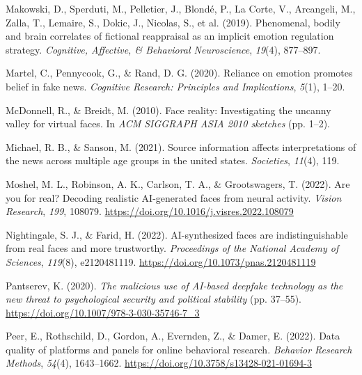 \documentclass[
  man,floatsintext]{apa6}
\newlength{\cslhangindent}
\newlength{\cslentryspacingunit} %
\newenvironment{CSLReferences}[2] %
 {%
  \setlength{\parindent}{0pt}
  \ifodd #1
  \let\oldpar\par
  \def\par{\hangindent=\cslhangindent\oldpar}
  \fi
  \setlength{\parskip}{#2\cslentryspacingunit}
 }%
 {}
\begin{document}
\begin{CSLReferences}{1}{0}
\leavevmode{}%
Makowski, D., Sperduti, M., Pelletier, J., Blondé, P., La Corte, V., Arcangeli, M., Zalla, T., Lemaire, S., Dokic, J., Nicolas, S., et al. (2019). Phenomenal, bodily and brain correlates of fictional reappraisal as an implicit emotion regulation strategy. \emph{Cognitive, Affective, \& Behavioral Neuroscience}, \emph{19}(4), 877--897.

\leavevmode{}%
Martel, C., Pennycook, G., \& Rand, D. G. (2020). Reliance on emotion promotes belief in fake news. \emph{Cognitive Research: Principles and Implications}, \emph{5}(1), 1--20.

\leavevmode{}%
McDonnell, R., \& Breidt, M. (2010). Face reality: Investigating the uncanny valley for virtual faces. In \emph{ACM SIGGRAPH ASIA 2010 sketches} (pp. 1--2).

\leavevmode{}%
Michael, R. B., \& Sanson, M. (2021). Source information affects interpretations of the news across multiple age groups in the united states. \emph{Societies}, \emph{11}(4), 119.

\leavevmode{}%
Moshel, M. L., Robinson, A. K., Carlson, T. A., \& Grootswagers, T. (2022). Are you for real? Decoding realistic AI-generated faces from neural activity. \emph{Vision Research}, \emph{199}, 108079. \url{https://doi.org/10.1016/j.visres.2022.108079}

\leavevmode{}%
Nightingale, S. J., \& Farid, H. (2022). AI-synthesized faces are indistinguishable from real faces and more trustworthy. \emph{Proceedings of the National Academy of Sciences}, \emph{119}(8), e2120481119. \url{https://doi.org/10.1073/pnas.2120481119}

\leavevmode{}%
Pantserev, K. (2020). \emph{The malicious use of AI-based deepfake technology as the new threat to psychological security and political stability} (pp. 37--55). \url{https://doi.org/10.1007/978-3-030-35746-7_3}

\leavevmode{}%
Peer, E., Rothschild, D., Gordon, A., Evernden, Z., \& Damer, E. (2022). Data quality of platforms and panels for online behavioral research. \emph{Behavior Research Methods}, \emph{54}(4), 1643--1662. \url{https://doi.org/10.3758/s13428-021-01694-3}


\end{CSLReferences}
\end{document}
